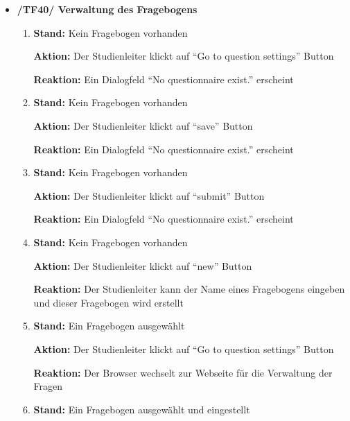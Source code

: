 \documentclass[a4paper]{scrreprt}
\begin{document}
\begin{itemize}
                \item \textbf{/TF40/ Verwaltung des Fragebogens}
                    \begin{enumerate}
                        \item \par \textbf{Stand: }Kein Fragebogen vorhanden
                              \par \textbf{Aktion: }Der \gls{Studienleiter} klickt auf ``Go to question settings'' Button
                              \par \textbf{Reaktion: }Ein Dialogfeld ``No questionnaire exist.'' erscheint
                        \item \par \textbf{Stand: } Kein Fragebogen vorhanden
                              \par \textbf{Aktion: }Der \gls{Studienleiter} klickt auf ``save'' Button
                              \par \textbf{Reaktion: }Ein Dialogfeld ``No questionnaire exist.'' erscheint
                        \item \par \textbf{Stand: }Kein Fragebogen vorhanden
                              \par \textbf{Aktion: }Der \gls{Studienleiter} klickt auf ``submit'' Button
                              \par \textbf{Reaktion: }Ein Dialogfeld ``No questionnaire exist.'' erscheint
                        \item \par \textbf{Stand: }Kein Fragebogen vorhanden
                              \par \textbf{Aktion: }Der \gls{Studienleiter} klickt auf ``new'' Button
                              \par \textbf{Reaktion: }Der \gls{Studienleiter} kann der Name eines Fragebogens eingeben und dieser Fragebogen wird erstellt
                        \item \par \textbf{Stand: }Ein Fragebogen ausgewählt
                              \par \textbf{Aktion: }Der \gls{Studienleiter} klickt auf ``Go to question settings'' Button
                              \par \textbf{Reaktion: }Der Browser wechselt zur Webseite für die Verwaltung der Fragen
                        \item \par \textbf{Stand: }Ein Fragebogen ausgewählt und eingestellt

\end{enumerate}
\end{itemize}
\end{document}
